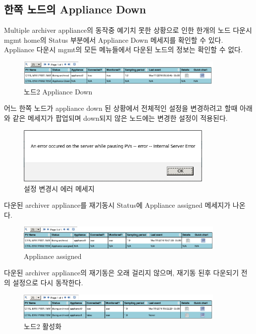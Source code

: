 \documentclass[11pt
  , a4paper
  , article
  , oneside
]{memoir}
\begin{document}
\subsection{한쪽 노드의 Appliance Down}
Multiple archiver appliance의 동작중 예기치 못한 상황으로 인한 한개의 노드 다운시 mgmt home의 Status 부분에서 Appliance Down 메세지를 확인할 수 있다. Appliance 다운시 mgmt의 모든 메뉴들에서 다운된 노드의 정보는 확인할 수 없다.
\begin{figure}[h!]
	\centering
	\includegraphics[width=0.9\textwidth, height=0.15\textheight]{./images/Selection_012.png}
	\caption{노드2 Appliance Down}
\end{figure}

어느 한쪽 노드가 appliance down 된 상황에서 전체적인 설정을 변경하려고 할때 아래와 같은 메세지가 팝업되며 down되지 않은 노드에는 변경한 설정이 적용된다.
\begin{figure}[h!]
	\centering
	\includegraphics[width=0.85\textwidth, height=0.2\textheight]{./images/Selection_013.png}
	\caption{설정 변경시 에러 메세지}
\end{figure}

다운된 archiver appliance를 재기동시 Status에 Appliance assigned 메세지가 나온다.
\begin{figure}[h!]
	\centering
	\includegraphics[width=0.9\textwidth, height=0.15\textheight]{./images/Selection_014.png}
	\caption{Appliance assigned}
\end{figure}

다운된 archiver appliance의 재기동은 오래 걸리지 않으며, 재기동 된후 다운되기 전의 설정으로 다시 동작한다.
\begin{figure}[h!]
	\centering
	\includegraphics[width=0.9\textwidth, height=0.15\textheight]{./images/Selection_015.png}
	\caption{노드2 활성화}
\end{figure}
\end{document}
